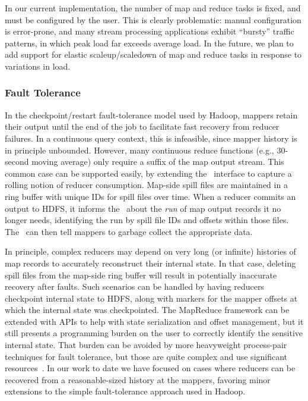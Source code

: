In our current implementation, the number of map and reduce tasks is
fixed, and must be configured by the user. This is clearly
problematic: manual configuration is error-prone, and many stream
processing applications exhibit ``bursty'' traffic patterns, in which
peak load far exceeds average load. In the future, we plan to add
support for elastic scaleup/scaledown of map and reduce tasks in
response to variations in load.

\subsubsection{Fault Tolerance}
In the checkpoint/restart fault-tolerance model used by Hadoop, mappers retain
their output until the end of the job to facilitate fast recovery from reducer
failures. In a continuous query context, this is infeasible, since mapper
history is in principle unbounded.  However, many continuous reduce functions
(e.g., 30-second moving average) only require a suffix of the map output stream.
This common case can be supported easily, by extending the \JT\ interface to
capture a rolling notion of reducer consumption.  Map-side spill files are
maintained in a ring buffer with unique IDs for spill files over time. When a
reducer commits an output to HDFS, it informs the \JT\ about the \emph{run} of
map output records it no longer needs, identifying the run by spill file IDs and
offsets within those files.  The \JT\ can then tell mappers to garbage collect
the appropriate data.

In principle, complex reducers may depend on very long (or infinite) histories of map records to accurately reconstruct their internal state.  In that case, deleting spill files
from the map-side ring buffer will result in potentially inaccurate recovery after faults.  Such scenarios can be handled by having reducers checkpoint internal state to HDFS, along with markers for the mapper offsets at which the internal state was checkpointed.  The MapReduce framework can be extended with APIs to help with state serialization and offset management, but it still presents a programming burden on the user to correctly identify the sensitive internal state.  That burden can be avoided by more heavyweight process-pair 
techniques for fault tolerance, but those are quite complex and use significant resources~\cite{flux-ft}.  In our work to date we have focused on cases where reducers can be recovered from a reasonable-sized history at the mappers, favoring minor extensions to the simple fault-tolerance approach used in Hadoop.


